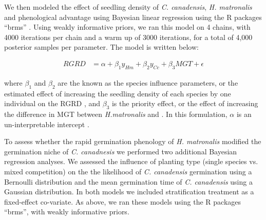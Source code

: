 \documentclass{article}\usepackage[]{graphicx}\usepackage[]{color}
\begin{document}
We then modeled the effect of seedling density of \textit{C. canadensis}, \textit{H. matronalis} and phenological advantage using Bayesian linear regression  using the R packages ``brms'' \citep{Burkner2018}. Using weakly informative priors, we ran this model on 4 chains, with 4000 iterations per chain and a warm up of 3000 iterations, for a total of 4,000 posterior samples per parameter. The model is written below:

\begin{align*}

RGRD &= \alpha + \beta_{1}y_{Hm} + \beta_{2}y_{Cc} + \beta_{3}MGT + \epsilon

\end{align*}

where  $\beta_{1}$ and $\beta_{2}$ are the known as the species influence parameters, or the estimated effect of increasing the seedling density of each species by one individual on the RGRD \citep{Connolly2005}, and $\beta_{3}$ is the priority effect, or the effect of increasing the difference in MGT between  \textit{H.matronalis} and . In this formulation, $\alpha$ is an un-interpretable intercept \citep{Connolly2005}.


To assess whether the rapid germination phenology of \textit{H. matronalis} modified the germination niche of \textit{C. canadnesis} we performed two additional Bayesian  regression analyses. We assessed the influence of planting type (single species vs. mixed competition) on the the likelihood of \textit{C. canadensis} germination using a Bernoulli distribution and the mean germination time of \textit{C. canadensis} using a Gaussian distribution. In both models we included stratification treatment as a fixed-effect co-variate. As above, we ran these models using the R packages ``brms''\citep{Burkner2018},  with weakly informative priors.
\end{document}
